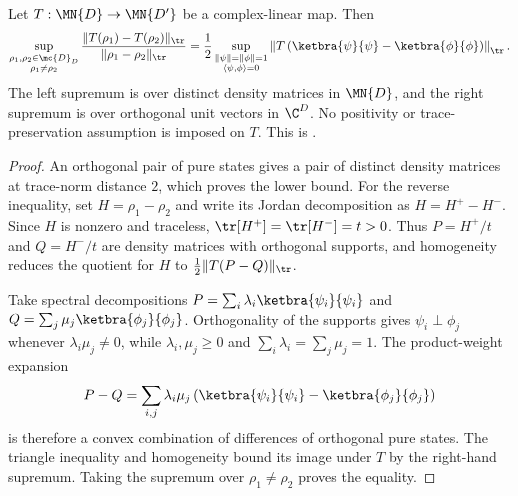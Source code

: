 \begin{lemma}
    \label{lem:trace_norm_contraction_coefficient}
    \leanok
    Let $T:\MN{D}\to\MN{D'}$ be a complex-linear map. Then
    \begin{align}
        \sup_{\substack{\rho_1,\rho_2\in\mc{D}_D                    \\ \rho_1\neq\rho_2}}
        \frac{\lVert T(\rho_1)-T(\rho_2)\rVert_{\tr}}
        {\lVert\rho_1-\rho_2\rVert_{\tr}}
        =\frac12\sup_{\substack{\lVert\psi\rVert=\lVert\phi\rVert=1 \\
                \langle\psi,\phi\rangle=0}}
        \left\lVert T\left(\ketbra{\psi}{\psi}
        -\ketbra{\phi}{\phi}\right)\right\rVert_{\tr}.
        \label{eq:trace_norm_contraction_coefficient}
    \end{align}
    The left supremum is over distinct density matrices in $\MN{D}$, and the
    right supremum is over orthogonal unit vectors in $\C^D$. No positivity or
    trace-preservation assumption is imposed on $T$.
    This is \cite[Chapter~8, Lemma~8.3, Eq.~(8.81)]{Wolf2012Quantum}.
\end{lemma}

\begin{proof}\leanok
    An orthogonal pair of pure states gives a pair of distinct density matrices
    at trace-norm distance $2$, which proves the lower bound. For the reverse
    inequality, set $H=\rho_1-\rho_2$ and write its Jordan decomposition as
    $H=H^+-H^-$. Since $H$ is nonzero and traceless,
    $\tr[H^+]=\tr[H^-]=t>0$. Thus $P=H^+/t$ and $Q=H^-/t$ are density matrices
    with orthogonal supports, and homogeneity reduces the quotient for $H$ to
    $\frac12\lVert T(P-Q)\rVert_{\tr}$.

    Take spectral decompositions
    $P=\sum_i\lambda_i\ketbra{\psi_i}{\psi_i}$ and
    $Q=\sum_j\mu_j\ketbra{\phi_j}{\phi_j}$. Orthogonality of the supports gives
    $\psi_i\perp\phi_j$ whenever $\lambda_i\mu_j\neq0$, while
    $\lambda_i,\mu_j\geq0$ and $\sum_i\lambda_i=\sum_j\mu_j=1$. The
    product-weight expansion
    \begin{align}
        P-Q=\sum_{i,j}\lambda_i\mu_j
        \left(\ketbra{\psi_i}{\psi_i}-\ketbra{\phi_j}{\phi_j}\right)
        \notag
    \end{align}
    is therefore a convex combination of differences of orthogonal pure
    states. The triangle inequality and homogeneity bound its image under $T$
    by the right-hand supremum. Taking the supremum over
    $\rho_1\neq\rho_2$ proves the equality.
\end{proof}


